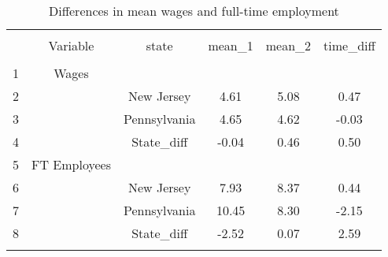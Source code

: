 
\begin{table}[!htbp] \centering 
  \caption{Differences in mean wages and full-time employment} 
  \label{Tab:Diff_table} 
\begin{tabular}{@{\extracolsep{5pt}} cccccc} 
\\[-1.8ex]\hline 
\hline \\[-1.8ex] 
 & Variable & state & mean\_1 & mean\_2 & time\_diff \\ 
\hline \\[-1.8ex] 
1 & Wages &  &  &  &  \\ 
2 &  & New Jersey &  4.61 & 5.08 &  0.47 \\ 
3 &  & Pennsylvania &  4.65 & 4.62 & -0.03 \\ 
4 &  & State\_diff & -0.04 & 0.46 &  0.50 \\ 
5 & FT Employees &  &  &  &  \\ 
6 &  & New Jersey &  7.93 & 8.37 &  0.44 \\ 
7 &  & Pennsylvania & 10.45 & 8.30 & -2.15 \\ 
8 &  & State\_diff & -2.52 & 0.07 &  2.59 \\ 
\hline \\[-1.8ex] 
\end{tabular} 
\end{table} 
